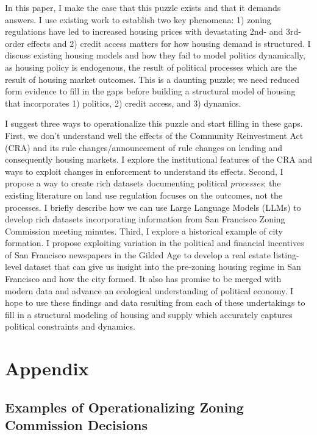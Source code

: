 \documentclass{article}[11pt]
\begin{document}
In this paper, I make the case that this puzzle exists and that it demands answers. I use existing work to establish two key phenomena: 1) zoning regulations have led to increased housing prices with devastating 2nd- and 3rd-order effects and 2) credit access matters for how housing demand is structured. I discuss existing housing models and how they fail to model politics dynamically, as housing policy is endogenous, the result of political processes which are the result of housing market outcomes. This is a daunting puzzle; we need reduced form evidence to fill in the gaps before building a structural model of housing that incorporates 1) politics, 2) credit access, and 3) dynamics. 

I suggest three ways to operationalize this puzzle and start filling in these gaps. First, we don't understand well the effects of the Community Reinvestment Act (CRA) and its rule changes/announcement of rule changes on lending and consequently housing markets. I explore the institutional features of the CRA and ways to exploit changes in enforcement to understand its effects. Second, I propose a way to create rich datasets documenting political \textit{processes}; the existing literature on land use regulation focuses on the outcomes, not the processes. I briefly describe how we can use Large Language Models (LLMs) to develop rich datasets incorporating information from San Francisco Zoning Commission meeting minutes. Third, I explore a historical example of city formation. I propose exploiting variation in the political and financial incentives of San Francisco newspapers in the Gilded Age to develop a real estate listing-level dataset that can give us insight into the pre-zoning housing regime in San Francisco and how the city formed. It also has promise to be merged with modern data and advance an ecological understanding of political economy. I hope to use these findings and data resulting from each of these undertakings to fill in a structural modeling of housing and supply which accurately captures political constraints and dynamics.
	
\section{Appendix}

	\subsection{Examples of Operationalizing Zoning Commission Decisions}
	
\end{document}
